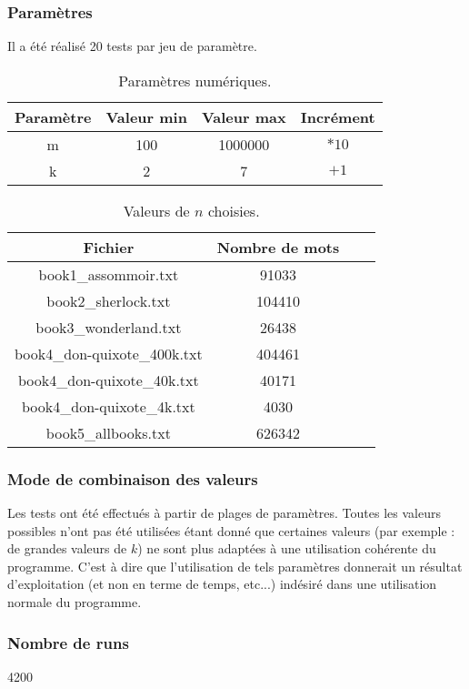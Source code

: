 \subsubsection{Paramètres}
Il a été réalisé 20 tests par jeu de paramètre.

\begin{table}[h!]
	\centering
	\caption{Paramètres numériques.}
	\label{tab:parametresNumeriquesFournie}
	\begin{tabular}{c|ccc}
		\toprule
		Paramètre & Valeur min & Valeur max & Incrément\\
		\midrule
		m & 100 & 1000000 & $*10$\\
		k & 2 & 7 & $+1$\\
		\bottomrule
	\end{tabular}
\end{table}

\begin{table}[h!]
	\centering
	\caption{Valeurs de $n$ choisies.}
	\label{tab:valeursDeNChoisiesFournie}
	\begin{tabular}{c|ccc}
		\toprule
		Fichier & Nombre de mots\\
		\midrule
		book1\_assommoir.txt & 91033\\
		book2\_sherlock.txt & 104410\\
		book3\_wonderland.txt & 26438\\
		book4\_don-quixote\_400k.txt & 404461\\
		book4\_don-quixote\_40k.txt & 40171\\
		book4\_don-quixote\_4k.txt & 4030\\
		book5\_allbooks.txt & 626342\\
		\bottomrule
	\end{tabular}
\end{table}


\subsubsection{Mode de combinaison des valeurs}
Les tests ont été effectués à partir de plages de paramètres. Toutes les valeurs possibles n'ont pas été utilisées étant donné que certaines valeurs (par exemple : de grandes valeurs de $k$) ne sont plus adaptées à une utilisation cohérente du programme. C'est à dire que l'utilisation de tels paramètres donnerait un résultat d'exploitation (et non en terme de temps, etc...) indésiré dans une utilisation normale du programme.

\subsubsection{Nombre de runs}
4200

